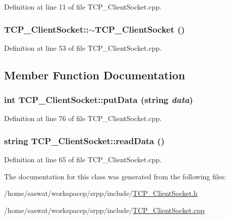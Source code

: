 Definition at line 11 of file TCP\_\-ClientSocket.cpp.

\hypertarget{class_t_c_p___client_socket_a4c72face71a46add0f3a96975075aa71}{
\subsubsection[{$\sim$TCP\_\-ClientSocket}]{\setlength{\rightskip}{0pt plus 5cm}TCP\_\-ClientSocket::$\sim$TCP\_\-ClientSocket ()}}
\label{class_t_c_p___client_socket_a4c72face71a46add0f3a96975075aa71}


Definition at line 53 of file TCP\_\-ClientSocket.cpp.



\subsection{Member Function Documentation}
\hypertarget{class_t_c_p___client_socket_a5ef81cfbe2abbe303801767d037c66de}{
\subsubsection[{putData}]{\setlength{\rightskip}{0pt plus 5cm}int TCP\_\-ClientSocket::putData (string {\em data})}}
\label{class_t_c_p___client_socket_a5ef81cfbe2abbe303801767d037c66de}


Definition at line 76 of file TCP\_\-ClientSocket.cpp.

\hypertarget{class_t_c_p___client_socket_a9305953edacf32da51b0b18b19c22512}{
\subsubsection[{readData}]{\setlength{\rightskip}{0pt plus 5cm}string TCP\_\-ClientSocket::readData ()}}
\label{class_t_c_p___client_socket_a9305953edacf32da51b0b18b19c22512}


Definition at line 65 of file TCP\_\-ClientSocket.cpp.



The documentation for this class was generated from the following files:\begin{DoxyCompactItemize}
\item 
/home/saswat/workspacep/srpp/include/\hyperlink{_t_c_p___client_socket_8h}{TCP\_\-ClientSocket.h}\item 
/home/saswat/workspacep/srpp/include/\hyperlink{_t_c_p___client_socket_8cpp}{TCP\_\-ClientSocket.cpp}\end{DoxyCompactItemize}
